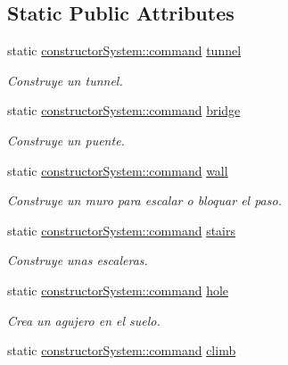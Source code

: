 \subsection*{Static Public Attributes}
\begin{DoxyCompactItemize}
\item 
static \hyperlink{classant_1_1constructor_system_a0977052dc8865f8e79ae03b4f3e18d8a}{constructor\+System\+::command} \hyperlink{classant_1_1_constructions_a840caf607a2a82b46ec083ce00fc55bc}{tunnel}
\begin{DoxyCompactList}\small\item\em Construye un tunnel. \end{DoxyCompactList}\item 
static \hyperlink{classant_1_1constructor_system_a0977052dc8865f8e79ae03b4f3e18d8a}{constructor\+System\+::command} \hyperlink{classant_1_1_constructions_a6eee22549eb50890813b3103814b2f8f}{bridge}
\begin{DoxyCompactList}\small\item\em Construye un puente. \end{DoxyCompactList}\item 
static \hyperlink{classant_1_1constructor_system_a0977052dc8865f8e79ae03b4f3e18d8a}{constructor\+System\+::command} \hyperlink{classant_1_1_constructions_a5ce348044e05b13b73f170fe2ced494d}{wall}
\begin{DoxyCompactList}\small\item\em Construye un muro para escalar o bloquar el paso. \end{DoxyCompactList}\item 
static \hyperlink{classant_1_1constructor_system_a0977052dc8865f8e79ae03b4f3e18d8a}{constructor\+System\+::command} \hyperlink{classant_1_1_constructions_a19d388ea2eb5a1a55456e1714c657ebb}{stairs}
\begin{DoxyCompactList}\small\item\em Construye unas escaleras. \end{DoxyCompactList}\item 
static \hyperlink{classant_1_1constructor_system_a0977052dc8865f8e79ae03b4f3e18d8a}{constructor\+System\+::command} \hyperlink{classant_1_1_constructions_a41b65912d7d2fd13b6fabe0af8ee88d6}{hole}
\begin{DoxyCompactList}\small\item\em Crea un agujero en el suelo. \end{DoxyCompactList}\item 
static \hyperlink{classant_1_1constructor_system_a0977052dc8865f8e79ae03b4f3e18d8a}{constructor\+System\+::command} \hyperlink{classant_1_1_constructions_a4c51e8694bc83487513a763e8c474535}{climb}

\end{DoxyCompactItemize}
